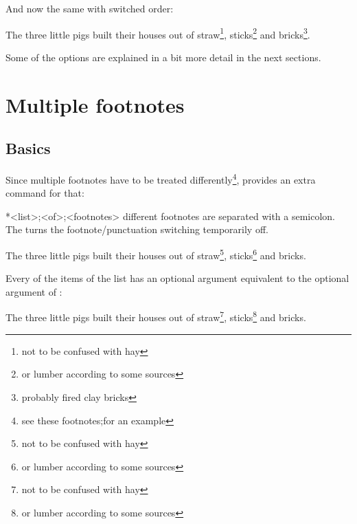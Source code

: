 \documentclass[toc=index,toc=bib]{cnpkgdoc}
\begin{document}
And now the same with switched order:
\begin{beispiel}
 \begin{minipage}{.4\linewidth}
  \noindent The three little pigs built their houses
  out of straw\footnote{not to be confused with hay},
  sticks\footnote{or lumber according to some sources}
  and bricks\footnote{probably fired clay bricks}.
 \end{minipage}
\end{beispiel}

Some of the options are explained in a bit more detail in the next sections.

\section{Multiple footnotes}\label{sec:multiple}
\subsection{Basics}
Since multiple footnotes have to be treated differently\footnote{see these footnotes;for an example},
\fnpct provides an extra command for that:
\begin{beschreibung}
 *{<list>;<of>;<footnotes>} different footnotes are separated
 with a semicolon. The \code{*} turns the footnote/punctuation switching temporarily
 off.
\end{beschreibung}
\begin{beispiel}
 \begin{minipage}{.4\linewidth}
  \noindent The three little pigs built their houses
  out of straw\footnote{not to be confused with hay},
  sticks\footnote{or lumber according to some sources}
  and bricks.
 \end{minipage}
\end{beispiel}

Every of the items of the list has an optional argument equivalent to the optional
argument of :
\begin{beispiel}
 \begin{minipage}{.4\linewidth}
  \noindent The three little pigs built their houses
  out of straw\footnote{not to be confused with hay},
  sticks\footnote{or lumber according to some sources}
  and bricks.
 \end{minipage}
\end{beispiel}
\end{document}
